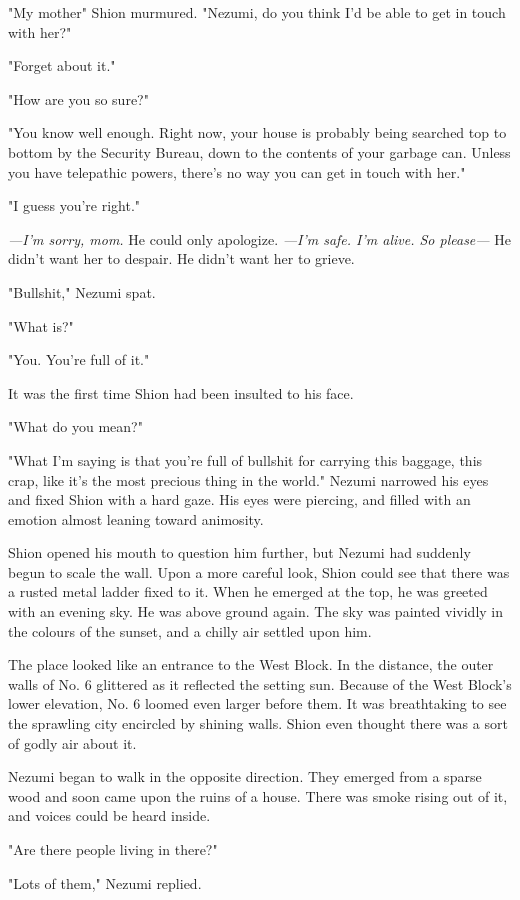 "My mother\el " Shion murmured. "Nezumi, do you think I'd be able to get
in touch with her?"

"Forget about it."

"How are you so sure?"

"You know well enough. Right now, your house is probably being searched
top to bottom by the Security Bureau, down to the contents of your
garbage can. Unless you have telepathic powers, there's no way you can
get in touch with her."

"I guess you're right."

\emph{---I'm sorry, mom.} He could only apologize. \emph{---I'm safe. I'm alive. So
please---} He didn't want her to despair. He didn't want her to grieve.

"Bullshit," Nezumi spat.

"What is?"

"You. You're full of it."

It was the first time Shion had been insulted to his face.

"What do you mean?"

"What I'm saying is that you're full of bullshit for carrying this
baggage, this crap, like it's the most precious thing in the world."
Nezumi narrowed his eyes and fixed Shion with a hard gaze. His eyes were
piercing, and filled with an emotion almost leaning toward animosity.

Shion opened his mouth to question him further, but Nezumi had suddenly
begun to scale the wall. Upon a more careful look, Shion could see that
there was a rusted metal ladder fixed to it. When he emerged at the top,
he was greeted with an evening sky. He was above ground again. The sky
was painted vividly in the colours of the sunset, and a chilly air
settled upon him.

The place looked like an entrance to the West Block. In the distance,
the outer walls of No. 6 glittered as it reflected the setting sun.
Because of the West Block's lower elevation, No. 6 loomed even larger
before them. It was breathtaking to see the sprawling city encircled by
shining walls. Shion even thought there was a sort of godly air about
it.

Nezumi began to walk in the opposite direction. They emerged from a
sparse wood and soon came upon the ruins of a house. There was smoke
rising out of it, and voices could be heard inside.

"Are there people living in there?"

"Lots of them," Nezumi replied.

